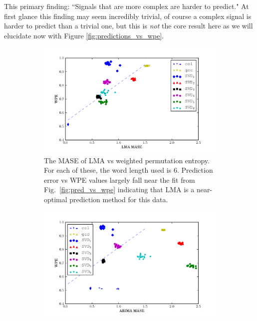 \documentclass{article}
\begin{document}
This primary finding: ``Signals that are more complex are harder to predict." At
first glance this finding may seem incredibly trivial, of course a complex
signal is harder to predict than a trivial one, but this is \emph{not} the core
result here as we will elucidate now with Figure \ref{fig:predictions_vs_wpe}.
\begin{figure}[htbp]
  \centering
  \begin{subfigure}[t]{0.5\textwidth}
    \includegraphics[width=1.0\textwidth]{figs/LMA_prediction_vs_entropy}
    \caption{The MASE of LMA vs weighted permutation entropy. For each of these,
    the word length used is $6$. Prediction error vs WPE values largely fall
    near the fit from Fig.~\ref{fig:pred_vs_wpe} indicating that LMA is a near-
    optimal prediction method for this data.}
    \label{fig:lma_pred_vs_wpe}
  \end{subfigure}%
  \begin{subfigure}[t]{0.5\textwidth}
    \includegraphics[width=1.0\textwidth]{figs/ARIMA_prediction_vs_entropy}

\end{subfigure}
\end{figure}
\end{document}
